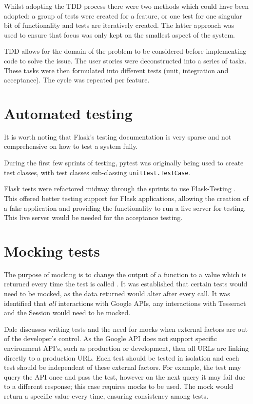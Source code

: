 Whilst adopting the TDD process there were two methods which could have been adopted:  a group of tests were created for a feature, or one test for one singular bit of functionality and tests are iteratively created. The latter approach was used to ensure that focus was only kept on the smallest aspect of the system.


TDD allows for the domain of the problem to be considered before implementing code to solve the issue. The user stories were deconstructed into a series of tasks. These tasks were then formulated into different tests (unit, integration and acceptance). The cycle was repeated per feature.

\section{Automated testing}
It is worth noting that Flask's testing documentation is very sparse and not comprehensive on how to test a system fully.

During the first few sprints of testing, pytest \cite{citeulike:14020583} was originally being used to create test classes, with test classes sub-classing  \texttt{unittest.TestCase}.

Flask tests were refactored midway through the sprints to use Flask-Testing \cite{citeulike:14020588}. This offered better testing support for Flask applications, allowing the creation of a fake application and providing the functionality to run a live server for testing. This live server would be needed for the acceptance testing.

\section{Mocking tests}
The purpose of mocking is to change the output of a function to a value which is returned every time the test is called \cite{citeulike:14020596}. It was established that certain tests would need to be mocked, as the data returned would alter after every call. It was identified that \textit{all} interactions with Google APIs, any interactions with Tesseract and the Session would need to be mocked.

Dale \cite{citeulike:14020597} discusses writing tests and the need for mocks when external factors are out of the developer's control. As the Google API does not support specific environment API's, such as production or development, then all URLs are linking directly to a production URL. Each test should be tested in isolation and each test should be independent of these external factors. For example, the test may query the API once and pass the test, however on the next query it may fail due to a different response; this case requires mocks to be used. The mock would return a specific value every time, ensuring consistency among tests.

